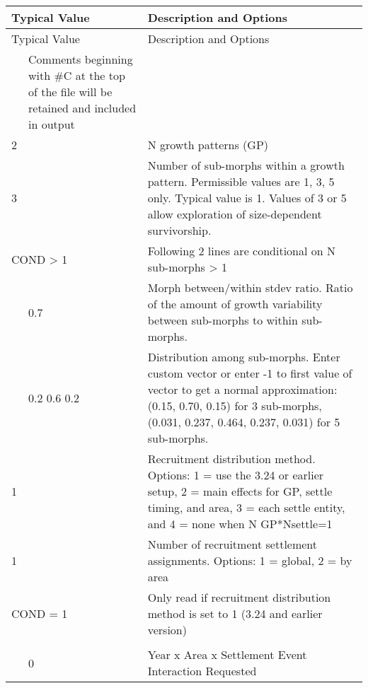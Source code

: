 \begin{center}

	\begin{longtable}{p{0.5cm} p{2cm} p{12cm}}

		\multicolumn{2}{l}{Typical Value} & Description and Options\\
		\hline
		\endfirsthead

		\multicolumn{2}{l}{Typical Value} & Description and Options\\
		\hline
		\endhead

		\hline
		\endfoot

		\endlastfoot

		\multicolumn{2}{l}{\#C comment } & Comments beginning with \#C at the top of the file will be retained and included in output  \\
		\hline

		2 & & N growth patterns (GP)  \\
		\hline

		3 & & Number of sub-morphs within a growth pattern. Permissible values are 1, 3, 5 only.  Typical value is 1.  Values of 3 or 5 allow exploration of size-dependent survivorship. \\
		\hline

		\multicolumn{2}{l}{COND > 1}& \multicolumn{1}{l}{\parbox{12cm}{Following 2 lines are conditional on N sub-morphs > 1}} \\

		& 0.7 & Morph between/within stdev ratio. Ratio of the amount of growth variability between sub-morphs to within sub-morphs.\\
		\hline

		& 0.2 0.6 0.2 & Distribution among sub-morphs. Enter custom vector or enter -1 to first value of vector to get a normal approximation: (0.15, 0.70, 0.15) for 3 sub-morphs, (0.031, 0.237, 0.464, 0.237, 0.031) for 5 sub-morphs.\\
		\hline

		1 & & Recruitment distribution method.  Options: 1 = use the 3.24 or earlier setup, 2 = main effects for GP, settle timing, and area, 3 = each settle entity, and 4 = none when N GP*Nsettle=1\\
		\hline

		1 & & Number of recruitment settlement assignments. Options: 1 = global, 2 = by area\\
		\hline

		\multicolumn{2}{l}{COND = 1}&\multicolumn{1}{l}{\multirow{1}{12cm}[-0.1cm]{\parbox{12.5cm}{Only read if recruitment distribution method is set to 1 (3.24 and earlier version)}}}\\
		\\
		& 0 & \multicolumn{1}{l}{\multirow{1}{12cm}[0cm]{\parbox{12.5cm}{Year x Area x Settlement Event Interaction Requested}}}\\
		\hline


\end{longtable}
\end{center}
